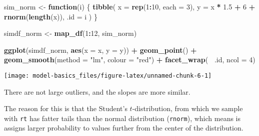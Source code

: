 \documentclass[]{book}
\newenvironment{Shaded}{\begin{snugshade}}{\end{snugshade}}
\newcommand{\ControlFlowTok}[1]{\textcolor[rgb]{0.13,0.29,0.53}{\textbf{#1}}}
\newcommand{\DataTypeTok}[1]{\textcolor[rgb]{0.13,0.29,0.53}{#1}}
\newcommand{\DecValTok}[1]{\textcolor[rgb]{0.00,0.00,0.81}{#1}}
\newcommand{\FloatTok}[1]{\textcolor[rgb]{0.00,0.00,0.81}{#1}}
\newcommand{\KeywordTok}[1]{\textcolor[rgb]{0.13,0.29,0.53}{\textbf{#1}}}
\newcommand{\NormalTok}[1]{#1}
\newcommand{\OperatorTok}[1]{\textcolor[rgb]{0.81,0.36,0.00}{\textbf{#1}}}
\newcommand{\StringTok}[1]{\textcolor[rgb]{0.31,0.60,0.02}{#1}}
\theoremstyle{plain}
\theoremstyle{remark}
\theoremstyle{definition}
\theoremstyle{definition}
\theoremstyle{definition}
\theoremstyle{remark}
\begin{document}
\begin{Shaded}
\begin{Highlighting}[]
\NormalTok{sim_norm <-}\StringTok{ }\ControlFlowTok{function}\NormalTok{(i) \{}
  \KeywordTok{tibble}\NormalTok{(}
    \DataTypeTok{x =} \KeywordTok{rep}\NormalTok{(}\DecValTok{1}\OperatorTok{:}\DecValTok{10}\NormalTok{, }\DataTypeTok{each =} \DecValTok{3}\NormalTok{),}
    \DataTypeTok{y =}\NormalTok{ x }\OperatorTok{*}\StringTok{ }\FloatTok{1.5} \OperatorTok{+}\StringTok{ }\DecValTok{6} \OperatorTok{+}\StringTok{ }\KeywordTok{rnorm}\NormalTok{(}\KeywordTok{length}\NormalTok{(x)),}
    \DataTypeTok{.id =}\NormalTok{ i}
\NormalTok{  )}
\NormalTok{\}}

\NormalTok{simdf_norm <-}\StringTok{ }\KeywordTok{map_df}\NormalTok{(}\DecValTok{1}\OperatorTok{:}\DecValTok{12}\NormalTok{, sim_norm)}

\KeywordTok{ggplot}\NormalTok{(simdf_norm, }\KeywordTok{aes}\NormalTok{(}\DataTypeTok{x =}\NormalTok{ x, }\DataTypeTok{y =}\NormalTok{ y)) }\OperatorTok{+}
\StringTok{  }\KeywordTok{geom_point}\NormalTok{() }\OperatorTok{+}
\StringTok{  }\KeywordTok{geom_smooth}\NormalTok{(}\DataTypeTok{method =} \StringTok{"lm"}\NormalTok{, }\DataTypeTok{colour =} \StringTok{"red"}\NormalTok{) }\OperatorTok{+}
\StringTok{  }\KeywordTok{facet_wrap}\NormalTok{(}\OperatorTok{~}\StringTok{ }\NormalTok{.id, }\DataTypeTok{ncol =} \DecValTok{4}\NormalTok{)}
\end{Highlighting}
\end{Shaded}

\begin{center}\texttt{[image: model-basics\_files/figure-latex/unnamed-chunk-6-1]} \end{center}

There are not large outliers, and the slopes are more similar.

The reason for this is that the Student's \(t\)-distribution, from which
we sample with \texttt{rt} has fatter tails than the normal distribution
(\texttt{rnorm}), which means is assigns larger probability to values
further from the center of the distribution.

\begin{Shaded}
\end{Shaded}
\end{document}
